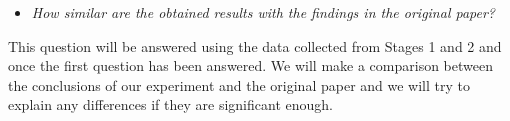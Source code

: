 \begin{itemize}
\item
  \emph{How similar are the obtained results with the findings in the
  original paper?}
\end{itemize}

This question will be answered using the data collected from Stages 1
and 2 and once the first question has been answered. We will make a
comparison between the conclusions of our experiment and the  original paper and we will try to
explain any differences if they are significant enough.


